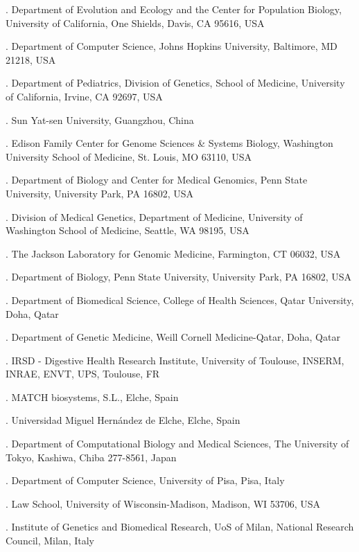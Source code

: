 \documentclass[pdflatex,mathphys]{jnl}
\begin{document}
{. Department of Evolution and Ecology and the Center for Population Biology, University of California, One Shields, Davis, CA 95616, USA\par
{}. Department of Computer Science, Johns Hopkins University, Baltimore, MD 21218, USA\par
{}. Department of Pediatrics, Division of Genetics, School of Medicine, University of California, Irvine, CA 92697, USA\par
{}. Sun Yat-sen University, Guangzhou, China\par
{}. Edison Family Center for Genome Sciences \& Systems Biology, Washington University School of Medicine, St. Louis, MO 63110, USA\par
{}. Department of Biology and Center for Medical Genomics, Penn State University, University Park, PA 16802, USA\par
{}. Division of Medical Genetics, Department of Medicine, University of Washington School of Medicine, Seattle, WA 98195, USA\par
{}. The Jackson Laboratory for Genomic Medicine, Farmington, CT 06032, USA\par
{}. Department of Biology, Penn State University, University Park, PA 16802, USA\par
{}. Department of Biomedical Science, College of Health Sciences, Qatar University, Doha, Qatar\par
{}. Department of Genetic Medicine, Weill Cornell Medicine-Qatar, Doha, Qatar\par
{}. IRSD - Digestive Health Research Institute, University of Toulouse, INSERM, INRAE, ENVT, UPS, Toulouse, FR\par
{}. MATCH biosystems, S.L., Elche, Spain\par
{}. Universidad Miguel Hern\'andez de Elche, Elche, Spain\par
{}. Department of Computational Biology and Medical Sciences, The University of Tokyo, Kashiwa, Chiba 277-8561, Japan\par
{}. Department of Computer Science, University of Pisa, Pisa, Italy\par
{}. Law School, University of Wisconsin-Madison, Madison, WI 53706, USA\par
{}. Institute of Genetics and Biomedical Research, UoS of Milan, National Research Council, Milan, Italy\par
}
\end{document}
